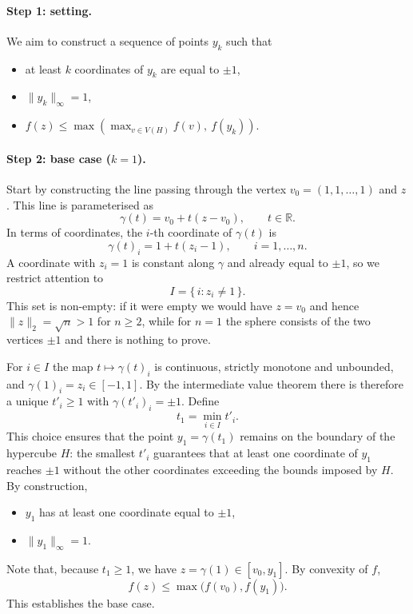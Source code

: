 \documentclass[11pt,a4paper]{article}
\begin{document}
\paragraph{Step 1: setting.}
We aim to construct a sequence of points $y_k$ such that
\begin{itemize}
  \item at least $k$ coordinates of $y_k$ are equal to $\pm 1$,
  \item $\|y_k\|_\infty = 1$,
  \item $f(z) \le \max\left( \max_{v \in V(H)} f(v),\ f(y_k) \right)$.
\end{itemize}

\paragraph{Step 2: base case ($k = 1$).}
Start by constructing the line passing through the vertex
$v_0 = (1, 1, \dots, 1)$ and $z$. This line is parameterised as
\[
  \gamma(t) = v_0 + t (z - v_0), \qquad t \in \mathbb{R}.
\]
In terms of coordinates, the $i$-th coordinate of $\gamma(t)$ is
\[
  \gamma(t)_i = 1 + t(z_i - 1), \qquad i = 1, \dots, n.
\]
A coordinate with $z_i = 1$ is constant along $\gamma$ and already equal to
$\pm 1$, so we restrict attention to
\[
  I = \{\, i : z_i \neq 1 \,\}.
\]
This set is non-empty: if it were empty we would have $z = v_0$ and hence
$\|z\|_2 = \sqrt{n} > 1$ for $n \ge 2$, while for $n = 1$ the sphere consists of
the two vertices $\pm 1$ and there is nothing to prove.

For $i \in I$ the map $t \mapsto \gamma(t)_i$ is continuous, strictly monotone
and unbounded, and $\gamma(1)_i = z_i \in [-1,1]$. By the intermediate value
theorem there is therefore a unique $t'_i \ge 1$ with $\gamma(t'_i)_i = \pm 1$.
Define
\[
  t_1 = \min_{i \in I} t'_i .
\]
This choice ensures that the point $y_1 = \gamma(t_1)$ remains on the boundary
of the hypercube $H$: the smallest $t'_i$ guarantees that at least one
coordinate of $y_1$ reaches $\pm 1$ without the other coordinates exceeding the
bounds imposed by $H$. By construction,
\begin{itemize}
  \item $y_1$ has at least one coordinate equal to $\pm 1$,
  \item $\|y_1\|_\infty = 1$.
\end{itemize}
Note that, because $t_1 \ge 1$, we have $z = \gamma(1) \in [v_0, y_1]$. By
convexity of $f$,
\[
  f(z) \le \max\big( f(v_0), f(y_1) \big).
\]
This establishes the base case.
\end{document}
